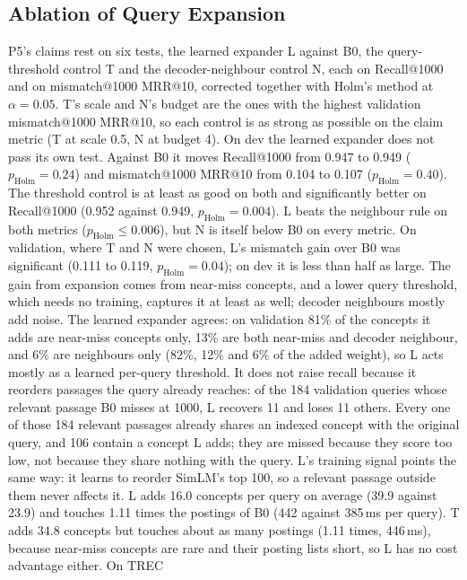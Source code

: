 \subsection{Ablation of Query Expansion}
\label{sec:p5-ablation}

P5's claims rest on six tests, the learned expander L against B0, the query-threshold control T and the
decoder-neighbour control N, each on Recall@1000 and on mismatch@1000 MRR@10, corrected together with Holm's
method at $\alpha=0.05$. T's scale and N's budget are the ones with the highest validation mismatch@1000
MRR@10, so each control is as strong as possible on the claim metric (T at scale 0.5, N at budget 4).
On dev the learned expander does not pass its own test. Against B0 it moves Recall@1000 from 0.947 to 0.949
($p_\text{Holm}=0.24$) and mismatch@1000 MRR@10 from 0.104 to 0.107 ($p_\text{Holm}=0.40$). The threshold
control is at least as good on both and significantly better on Recall@1000 (0.952 against 0.949,
$p_\text{Holm}=0.004$). L beats the neighbour rule on both metrics ($p_\text{Holm}\le 0.006$), but N is itself
below B0 on every metric. On validation, where T and N were chosen, L's mismatch gain over B0 was significant
(0.111 to 0.119, $p_\text{Holm}=0.04$); on dev it is less than half as large. The gain from expansion comes from
near-miss concepts, and a lower query threshold, which needs no training, captures it at least as well; decoder
neighbours mostly add noise. The learned expander agrees: on validation 81\% of the concepts it adds are
near-miss concepts only, 13\% are both near-miss and decoder neighbour, and 6\% are neighbours only (82\%, 12\%
and 6\% of the added weight), so L acts mostly as a learned per-query threshold. It does not raise recall
because it reorders passages the query already reaches: of the 184 validation queries whose relevant passage
B0 misses at 1000, L recovers 11 and loses 11 others. Every one of those 184 relevant passages already shares
an indexed concept with the original query, and 106 contain a concept L adds; they are missed because they
score too low, not because they share nothing with the query. L's training signal points the same way: it
learns to reorder SimLM's top 100, so a relevant passage outside them never affects it.
L adds 16.0 concepts per query on average (39.9 against 23.9) and touches 1.11 times the postings of B0
(442 against 385\,ms per query). T adds 34.8 concepts but touches about as many postings (1.11 times, 446\,ms),
because near-miss concepts are rare and their posting lists short, so L has no cost advantage either. On TREC
